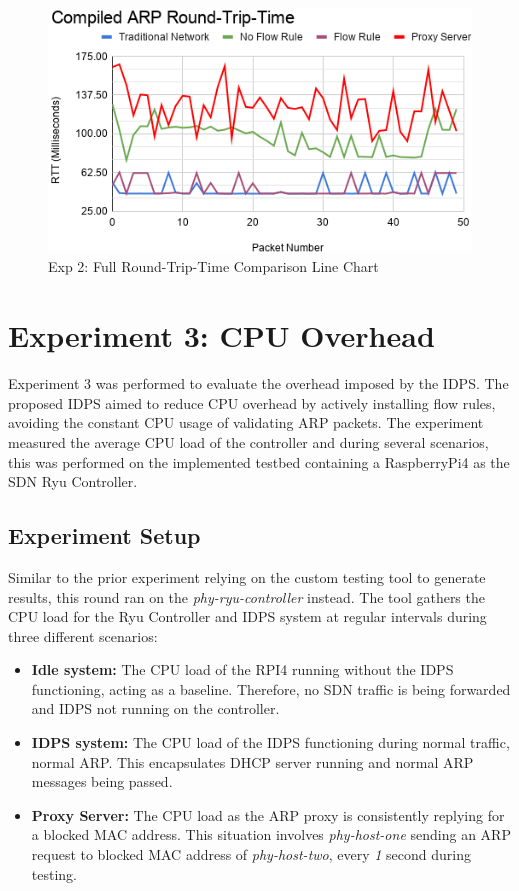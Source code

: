 \documentclass[12pt, oneside]{book}
\begin{document}
\begin{figure}[H]
	\centering
	\includegraphics[scale=0.78]{../tests/RTT/ARP_RTT_full.png}
	\caption{Exp 2: Full Round-Trip-Time Comparison Line Chart}
	\label{fig:rttfull}
\end{figure}

\newpage
\section{Experiment 3: CPU Overhead}
Experiment 3 was performed to evaluate the overhead imposed by the IDPS. The proposed IDPS aimed to reduce CPU 
overhead by actively installing flow rules, avoiding the constant CPU usage of validating ARP
packets.
The experiment measured the average CPU load of the controller and during several scenarios, this was performed
on the implemented testbed containing a RaspberryPi4 as the SDN Ryu Controller.

\subsection{Experiment Setup}
Similar to the prior experiment relying on the custom testing tool to generate results, this round ran on the \emph{phy-ryu-controller}
instead. The tool gathers the CPU load for the Ryu Controller and IDPS system 
at regular intervals during three different scenarios:

\begin{itemize}
  \itemsep0em 
  \item \textbf{Idle system:} The CPU load of the RPI4 running without the IDPS functioning, acting as a baseline.
        Therefore, no SDN traffic is being forwarded and IDPS not running on the controller.
  \item \textbf{IDPS system:} The CPU load of the IDPS functioning during normal traffic, normal ARP. This encapsulates
        DHCP server running and normal ARP messages being passed.
  \item \textbf{Proxy Server:} The CPU load as the ARP proxy is consistently replying for a blocked MAC address.
        This situation involves \emph{phy-host-one} sending an ARP request to blocked MAC address of \emph{phy-host-two},
        every \emph{1} second during testing.
\end{itemize}
\end{document}
